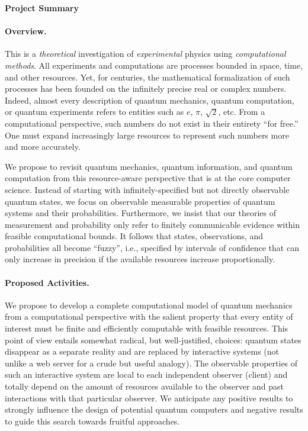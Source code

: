 \documentclass[11pt]{article}
\begin{document}
\pagestyle{empty}

\centerline{\Large\textbf{Project Summary}}
\medskip

\paragraph*{Overview.} This is a \emph{theoretical} investigation of
\emph{experimental} physics using \emph{computational methods}. All
experiments and computations are processes bounded in space, time, and
other resources. Yet, for centuries, the mathematical formalization of
such processes has been founded on the infinitely precise real or
complex numbers. Indeed, almost every description of quantum
mechanics, quantum computation, or quantum experiments refers to
entities such as $e$, $\pi$, $\sqrt{2}$, etc. From a computational
perspective, such numbers do not exist in their entirety ``for free.''
One must expand increasingly large resources to represent such numbers
more and more accurately. 

We propose to revisit quantum mechanics, quantum information, and
quantum computation from this resource-aware perspective that is at
the core computer science. Instead of starting with
infinitely-specified but not directly observable quantum states, we
focus on observable measurable properties of quantum systems and their
probabilities. Furthermore, we insist that our theories of measurement
and probability only refer to finitely communicable evidence within
feasible computational bounds. It follows that states, observations,
and probabilities all become ``fuzzy'', i.e., specified by intervals
of confidence that can only increase in precision if the available
resources increase proportionally. 

\paragraph*{Proposed Activities.} We propose to develop a complete
computational model of quantum mechanics from a computational
perspective with the salient property that every entity of interest
must be finite and efficiently computable with feasible
resources. This point of view entails somewhat radical, but
well-justified, choices: quantum states disappear as a separate
reality and are replaced by interactive systems (not unlike a web
server for a crude but useful analogy). The observable properties of
such an interactive system are local to each independent observer
(client) and totally depend on the amount of resources available to
the observer and past interactions with that particular observer. We
anticipate any positive results to strongly influence the design of
potential quantum computers and negative results to guide this search
towards fruitful approaches. 
\end{document}
